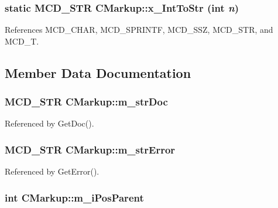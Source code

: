 \subsubsection[x\_\-IntToStr]{\setlength{\rightskip}{0pt plus 5cm}static MCD\_\-STR CMarkup::x\_\-IntToStr (int {\em n})\hspace{0.3cm}{\tt  [inline, static, protected]}}\label{classCMarkup_b4aa747f9324f96cbf41e80932723233}




References MCD\_\-CHAR, MCD\_\-SPRINTF, MCD\_\-SSZ, MCD\_\-STR, and MCD\_\-T.

\subsection{Member Data Documentation}
\subsubsection[m\_\-strDoc]{\setlength{\rightskip}{0pt plus 5cm}MCD\_\-STR {\bf CMarkup::m\_\-strDoc}\hspace{0.3cm}{\tt  [protected]}}\label{classCMarkup_ab2e01d57870e1c0e0493ab6e4446ad2}




Referenced by GetDoc().
\subsubsection[m\_\-strError]{\setlength{\rightskip}{0pt plus 5cm}MCD\_\-STR {\bf CMarkup::m\_\-strError}\hspace{0.3cm}{\tt  [protected]}}\label{classCMarkup_8b30e55981f924a867972eceab142163}




Referenced by GetError().
\subsubsection[m\_\-iPosParent]{\setlength{\rightskip}{0pt plus 5cm}int {\bf CMarkup::m\_\-iPosParent}\hspace{0.3cm}{\tt  [protected]}}\label{classCMarkup_f4be33a1bc8a5b2b5ca34ee59b11d702}




